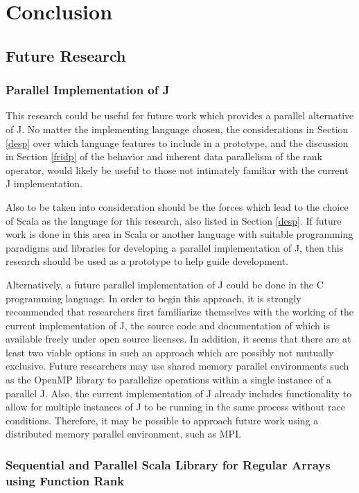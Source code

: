 \chapter{Conclusion}
\label{conc}

\section{Future Research}

\subsection{Parallel Implementation of J}
This research could be useful for future work which provides 
a parallel alternative of J.
No matter the implementing language chosen, 
the considerations in Section \ref{desp} 
over which language features to include in a prototype, 
and the discussion in Section \ref{fridp} of the behavior and inherent data parallelism of the rank operator, 
would likely be useful to those not intimately familiar with the current J implementation.

Also to be taken into consideration should be 
the forces which lead to the choice of Scala as the language 
for this research, also listed in Section \ref{desp}. 
If future work is done in this area in Scala 
or another language with suitable programming paradigms and libraries 
for developing a parallel implementation of J, 
then this research should be used as a prototype 
to help guide development.

Alternatively, a future parallel implementation of J
could be done in the C programming language. 
In order to begin this approach, 
it is strongly recommended that researchers first 
familiarize themselves with the working of the current implementation of J\cite{ioj}, 
the source code and documentation of which 
is available freely under open source licenses.
In addition, it seems that there are at least two viable options in such an approach 
which are possibly not mutually exclusive.
Future researchers may use shared memory parallel environments
such as the OpenMP library 
to parallelize operations within a single instance of a parallel J.
Also, the current implementation of J already includes 
functionality to allow for multiple instances of J to be running in the same process 
without race conditions.
Therefore, it may be possible to approach future work using 
a distributed memory parallel environment, such as MPI. %


\subsection{Sequential and Parallel Scala Library for Regular Arrays using Function Rank}
